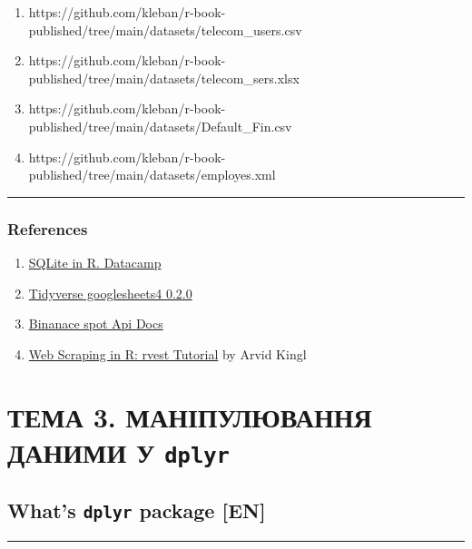\documentclass[
  letterpaper,
  DIV=11,
  numbers=noendperiod]{scrreprt}
\providecommand{\tightlist}{%
  \setlength{\itemsep}{0pt}\setlength{\parskip}{0pt}}\usepackage{longtable,booktabs,array}
\begin{document}
\begin{enumerate}
\def\labelenumi{\arabic{enumi}.}
\tightlist
\item
  https://github.com/kleban/r-book-published/tree/main/datasets/telecom\_users.csv
\item
  https://github.com/kleban/r-book-published/tree/main/datasets/telecom\_sers.xlsx
\item
  https://github.com/kleban/r-book-published/tree/main/datasets/Default\_Fin.csv
\item
  https://github.com/kleban/r-book-published/tree/main/datasets/employes.xml
\end{enumerate}

\begin{center}\rule{0.5\linewidth}{0.5pt}\end{center}

\section{References}\label{references-6}

\begin{enumerate}
\def\labelenumi{\arabic{enumi}.}
\tightlist
\item
  \href{https://www.datacamp.com/community/tutorials/sqlite-in-r}{SQLite
  in R. Datacamp}
\item
  \href{https://www.tidyverse.org/blog/2020/05/googlesheets4-0-2-0/}{Tidyverse
  googlesheets4 0.2.0}
\item
  \href{https://github.com/binance/binance-spot-api-docs/blob/master/rest-api.md\#klinecandlestick-data}{Binanace
  spot Api Docs}
\item
  \href{https://www.datacamp.com/community/tutorials/r-web-scraping-rvest}{Web
  Scraping in R: rvest Tutorial} by Arvid Kingl
\end{enumerate}

\part{ТЕМА 3. МАНІПУЛЮВАННЯ ДАНИМИ У \texttt{dplyr}}

\chapter{\texorpdfstring{What's \texttt{dplyr} package
{[}EN{]}}{What's dplyr package {[}EN{]}}}\label{whats-dplyr-package-en}

\begin{center}\rule{0.5\linewidth}{0.5pt}\end{center}
\end{document}
